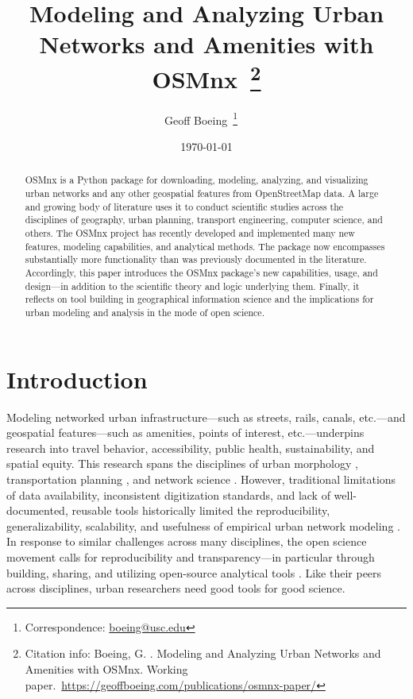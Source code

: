 \documentclass[12pt,letterpaper]{article} %
\makeatletter
\newcommand{\myname}{Geoff Boeing}
\newcommand{\myemail}{boeing@usc.edu}
\newcommand{\myaffiliation}{University of Southern California}
\newcommand{\paperdate}{\monthyeardate\today}
\newcommand{\papertitle}{Modeling and Analyzing Urban Networks and Amenities with OSMnx}
\newcommand{\papercitation}{Boeing, G. \the\year. \papertitle. Working paper.\ \href{https://geoffboeing.com/publications/osmnx-paper/}{https://geoffboeing.com/publications/osmnx-paper/}}
\makeatother
\begin{document}
\title{\papertitle~\footnote{Citation info: \papercitation}}
\author[]{\myname~\footnote{Correspondence: \href{mailto:\myemail}{\myemail}}~~}
\affil[]{\myaffiliation}
\date{\paperdate}

\maketitle

\begin{abstract}

OSMnx is a Python package for downloading, modeling, analyzing, and visualizing urban networks and any other geospatial features from OpenStreetMap data. A large and growing body of literature uses it to conduct scientific studies across the disciplines of geography, urban planning, transport engineering, computer science, and others. The OSMnx project has recently developed and implemented many new features, modeling capabilities, and analytical methods. The package now encompasses substantially more functionality than was previously documented in the literature. Accordingly, this paper introduces the OSMnx package's new capabilities, usage, and design---in addition to the scientific theory and logic underlying them. Finally, it reflects on tool building in geographical information science and the implications for urban modeling and analysis in the mode of open science.

\end{abstract}

\section{Introduction}

Modeling networked urban infrastructure---such as streets, rails, canals, etc.---and geospatial features---such as amenities, points of interest, etc.---underpins research into travel behavior, accessibility, public health, sustainability, and spatial equity. This research spans the disciplines of urban morphology \citep[e.g.,][]{gervasoni_calculating_2017,dacci_signature_2019,coutrot_entropy_2022}, transportation planning \citep[e.g.,][]{merchan_quantifying_2020,liao_disparities_2020,natera_orozco_data-driven_2020}, and network science \citep[e.g.,][]{feng_spatial_2020,yin_multi-task_2020,young_automatic_2020}. However, traditional limitations of data availability, inconsistent digitization standards, and lack of well-documented, reusable tools historically limited the reproducibility, generalizability, scalability, and usefulness of empirical urban network modeling \citep{liu_generalized_2022}. In response to similar challenges across many disciplines, the open science movement calls for reproducibility and transparency---in particular through building, sharing, and utilizing open-source analytical tools \citep{rey_show_2009,singleton_establishing_2016,rey_pysal:_2019,kedron_reproducibility_2021}. Like their peers across disciplines, urban researchers need good tools for good science.
\end{document}
